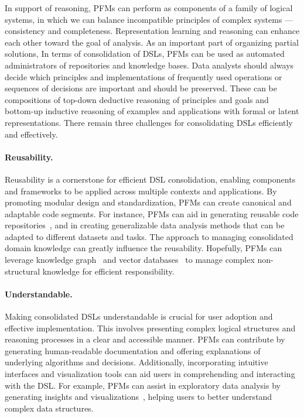   In support of reasoning, PFMs can perform as components of a family of logical systems, in which we can balance incompatible principles of complex systems — consistency and completeness. Representation learning and reasoning can enhance each other toward the goal of analysis. As an important part of organizing partial solutions, In terms of consolidation of DSLs, PFMs can be used as automated administrators of repositories and knowledge bases. Data analysts should always decide which principles and implementations of frequently used operations or sequences of decisions are important and should be preserved. These can be compositions of top-down deductive reasoning of principles and goals and bottom-up inductive reasoning of examples and applications with formal or latent representations. There remain three challenges for consolidating DSLs efficiently and effectively.
  
  \paragraph{Reusability.} Reusability is a cornerstone for efficient DSL consolidation, enabling components and frameworks to be applied across multiple contexts and applications. By promoting modular design and standardization, PFMs can create canonical and adaptable code segments. For instance, PFMs can aid in generating reusable code repositories~\cite{jain2024r2e, repocomp}, and in creating generalizable data analysis methods that can be adapted to different datasets and tasks. The approach to managing consolidated domain knowledge can greatly influence the reusability. Hopefully, PFMs can leverage knowledge graph~\cite{constructKG,KGobjectrecognition} and vector databases~\cite{vectorstorage} to manage complex non-structural knowledge for efficient responsibility.
  
  \paragraph{Understandable.} Making consolidated DSLs understandable is crucial for user adoption and effective implementation. This involves presenting complex logical structures and reasoning processes in a clear and accessible manner. PFMs can contribute by generating human-readable documentation and offering explanations of underlying algorithms and decisions. Additionally, incorporating intuitive interfaces and visualization tools can aid users in comprehending and interacting with the DSL. For example, PFMs can assist in exploratory data analysis by generating insights and visualizations~\cite{ma2023insightpilot, Dibia2023LIDAAT}, helping users to better understand complex data structures.
  
